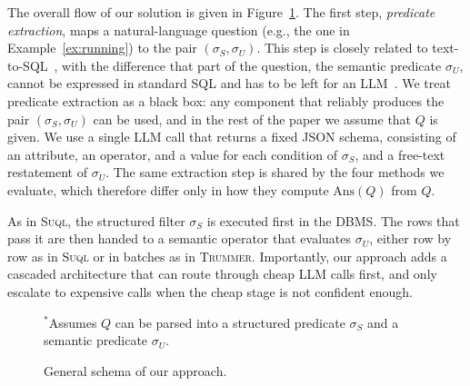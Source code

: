 \documentclass[sigconf]{acmart}
\begin{document}
The overall flow of our solution is given in Figure~\ref{fig:overview}. The first step, \emph{predicate extraction}, maps a natural-language question (e.g., the one in Example~\ref{ex:running}) to the pair $(\sigma_S,\sigma_U)$. This step is closely related to text-to-SQL~\cite{gao2023textosql}, with the difference that part of the question, the semantic predicate $\sigma_U$, cannot be expressed in standard SQL and has to be left for an LLM~\cite{biswal2024tag}. We treat predicate extraction as a black box: any component that reliably produces the pair $(\sigma_S,\sigma_U)$ can be used, and in the rest of the paper we assume that $Q$ is given. We use a single LLM call that returns a fixed JSON schema, consisting of an attribute, an operator, and a value for each condition of $\sigma_S$, and a free-text restatement of $\sigma_U$. The same extraction step is shared by the four methods we evaluate, which therefore differ only in how they compute $\mathrm{Ans}(Q)$ from $Q$.

As in \textsc{Suql}, the structured filter $\sigma_S$ is executed first in the DBMS. The rows that pass it are then handed to a semantic operator that evaluates $\sigma_U$, either row by row as in \textsc{Suql} or in batches as in \textsc{Trummer}. Importantly, our approach adds a cascaded architecture that can route through cheap LLM calls first, and only escalate to expensive calls when the cheap stage is not confident enough.

\begin{figure}[t]
\centering
{}

\vspace{2pt}
{\scriptsize $^*$Assumes $Q$ can be parsed into a structured predicate $\sigma_S$ and a semantic predicate $\sigma_U$.}
\caption{General schema of our approach.}
\label{fig:overview}
\end{figure}
\end{document}

